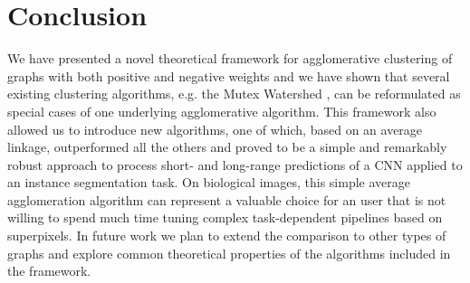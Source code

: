 \section{Conclusion}
We have presented a novel theoretical framework for agglomerative clustering of graphs with both positive and negative weights and we have shown that several existing clustering algorithms, e.g. the Mutex Watershed \cite{wolf2018mutex}, can be reformulated as special cases of one underlying agglomerative algorithm. This framework also allowed us to introduce new algorithms, one of which, based on an average linkage, outperformed all the others and proved to be a simple and remarkably robust approach to process short- and long-range predictions of a CNN applied to an instance segmentation task.
On biological images, this simple average agglomeration algorithm can represent a valuable choice for an user that is not willing to spend much time tuning complex task-dependent pipelines based on superpixels.  %
In future work we plan to extend the comparison to other types of graphs and explore common theoretical properties of the algorithms included in the framework.

